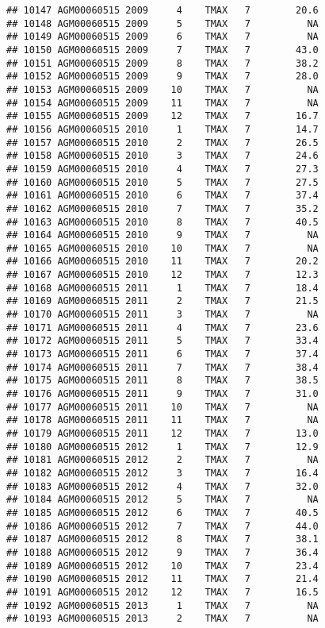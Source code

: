 \documentclass{article}\usepackage[]{graphicx}\usepackage[]{color}
\makeatletter
\newenvironment{kframe}{%
 \def\at@end@of@kframe{}%
 \ifinner\ifhmode%
  \def\at@end@of@kframe{\end{minipage}}%
  \begin{minipage}{\columnwidth}%
 \fi\fi%
 \def\FrameCommand##1{\hskip\@totalleftmargin \hskip-\fboxsep
 \colorbox{shadecolor}{##1}\hskip-\fboxsep
     \hskip-\linewidth \hskip-\@totalleftmargin \hskip\columnwidth}%
 \MakeFramed {\advance\hsize-\width
   \@totalleftmargin\z@ \linewidth\hsize
   \@setminipage}}%
 {\par\unskip\endMakeFramed%
 \at@end@of@kframe}
\newenvironment{knitrout}{}{} %
\makeatother
\begin{document}
\begin{knitrout}
\begin{kframe}
\begin{verbatim}
## 10147 AGM00060515 2009     4    TMAX   7        20.6
## 10148 AGM00060515 2009     5    TMAX   7          NA
## 10149 AGM00060515 2009     6    TMAX   7          NA
## 10150 AGM00060515 2009     7    TMAX   7        43.0
## 10151 AGM00060515 2009     8    TMAX   7        38.2
## 10152 AGM00060515 2009     9    TMAX   7        28.0
## 10153 AGM00060515 2009    10    TMAX   7          NA
## 10154 AGM00060515 2009    11    TMAX   7          NA
## 10155 AGM00060515 2009    12    TMAX   7        16.7
## 10156 AGM00060515 2010     1    TMAX   7        14.7
## 10157 AGM00060515 2010     2    TMAX   7        26.5
## 10158 AGM00060515 2010     3    TMAX   7        24.6
## 10159 AGM00060515 2010     4    TMAX   7        27.3
## 10160 AGM00060515 2010     5    TMAX   7        27.5
## 10161 AGM00060515 2010     6    TMAX   7        37.4
## 10162 AGM00060515 2010     7    TMAX   7        35.2
## 10163 AGM00060515 2010     8    TMAX   7        40.5
## 10164 AGM00060515 2010     9    TMAX   7          NA
## 10165 AGM00060515 2010    10    TMAX   7          NA
## 10166 AGM00060515 2010    11    TMAX   7        20.2
## 10167 AGM00060515 2010    12    TMAX   7        12.3
## 10168 AGM00060515 2011     1    TMAX   7        18.4
## 10169 AGM00060515 2011     2    TMAX   7        21.5
## 10170 AGM00060515 2011     3    TMAX   7          NA
## 10171 AGM00060515 2011     4    TMAX   7        23.6
## 10172 AGM00060515 2011     5    TMAX   7        33.4
## 10173 AGM00060515 2011     6    TMAX   7        37.4
## 10174 AGM00060515 2011     7    TMAX   7        38.4
## 10175 AGM00060515 2011     8    TMAX   7        38.5
## 10176 AGM00060515 2011     9    TMAX   7        31.0
## 10177 AGM00060515 2011    10    TMAX   7          NA
## 10178 AGM00060515 2011    11    TMAX   7          NA
## 10179 AGM00060515 2011    12    TMAX   7        13.0
## 10180 AGM00060515 2012     1    TMAX   7        12.9
## 10181 AGM00060515 2012     2    TMAX   7          NA
## 10182 AGM00060515 2012     3    TMAX   7        16.4
## 10183 AGM00060515 2012     4    TMAX   7        32.0
## 10184 AGM00060515 2012     5    TMAX   7          NA
## 10185 AGM00060515 2012     6    TMAX   7        40.5
## 10186 AGM00060515 2012     7    TMAX   7        44.0
## 10187 AGM00060515 2012     8    TMAX   7        38.1
## 10188 AGM00060515 2012     9    TMAX   7        36.4
## 10189 AGM00060515 2012    10    TMAX   7        23.4
## 10190 AGM00060515 2012    11    TMAX   7        21.4
## 10191 AGM00060515 2012    12    TMAX   7        16.5
## 10192 AGM00060515 2013     1    TMAX   7          NA
## 10193 AGM00060515 2013     2    TMAX   7          NA

\end{verbatim}
\end{kframe}
\end{knitrout}
\end{document}
